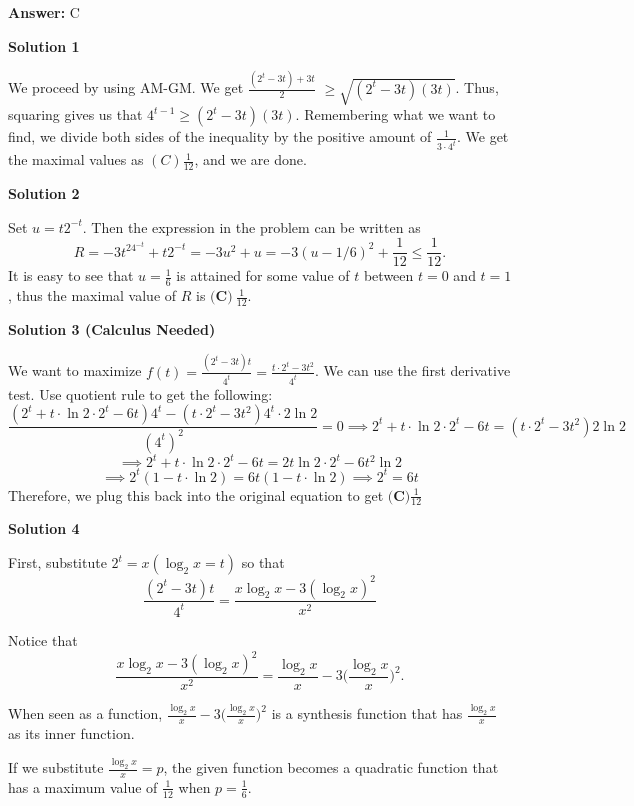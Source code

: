 \begin{enumerate}
 \textbf{Answer: }C



\textbf{Solution 1}

We proceed by using AM-GM. We get $\frac{(2^t-3t) + 3t}{2}$ $\ge \sqrt{(2^t-3t)(3t)}$. Thus, squaring gives us that $4^{t-1} \ge (2^t-3t)(3t)$. Remembering what we want to find, we divide both sides of the inequality by the positive amount of $\frac{1}{3\cdot4^t}$. We get the maximal values as $\boxed{(C)   \frac{1}{12}}$, and we are done.

 



\textbf{Solution 2}

Set $u = t2^{-t}$. Then the expression in the problem can be written as 
 \[R = - 3t^24^{-t} + t2^{-t}= - 3u^2 + u = - 3 (u - 1/6)^2 + \frac{1}{12} \le \frac{1}{12} .\] It is easy to see that $u =\frac{1}{6}$ is attained for some value of $t$ between $t = 0$ and $t = 1$, thus the maximal value of $R$ is $\textbf{(C)}\ \frac{1}{12}$.

 



\textbf{Solution 3 (Calculus Needed)}

We want to maximize $f(t) = \frac{(2^t-3t)t}{4^t} = \frac{t\cdot 2^t-3t^2}{4^t}$. We can use the first derivative test. Use quotient rule to get the following:
 \[\frac{(2^t + t\cdot \ln{2} \cdot 2^t - 6t)4^t - (t\cdot 2^t - 3t^2)4^t \cdot 2\ln{2}}{(4^t)^2} = 0 \implies 2^t + t\cdot \ln{2} \cdot 2^t - 6t = (t\cdot 2^t - 3t^2) 2\ln{2}\]
 \[\implies 2^t + t\cdot \ln{2}\cdot 2^t - 6t = 2t\ln{2} \cdot 2^t - 6t^2 \ln{2}\]
 \[\implies 2^t(1-t\cdot \ln{2}) = 6t(1 - t\cdot \ln{2}) \implies 2^t = 6t\]Therefore, we plug this back into the original equation to get $\boxed{\textbf{(C)} \frac{1}{12}}$




\textbf{Solution 4}

First, substitute $2^t = x (\log_2{x} = t)$ so that 
 \[\frac{(2^t-3t)t}{4^t} = \frac{x\log_2{x}-3(\log_2{x})^2}{x^2}\]

 Notice that 
 \[\frac{x\log_2{x}-3(\log_2{x})^2}{x^2} = \frac{\log_2{x}}{x}-3\Big(\frac{\log_2{x}}{x}\Big)^2.\]

 When seen as a function, $\frac{\log_2{x}}{x}-3\Big(\frac{\log_2{x}}{x}\Big)^2$ is a synthesis function that has $\frac{\log_2{x}}{x}$ as its inner function.

 If we substitute $\frac{\log_2{x}}{x} = p$, the given function becomes a quadratic function that has a maximum value of $\frac{1}{12}$ when $p = \frac{1}{6}$.


\end{enumerate}
